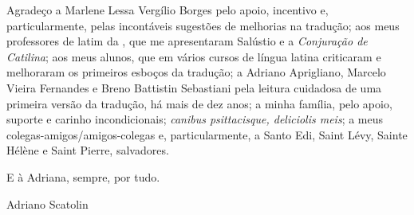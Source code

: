  
Agradeço a Marlene Lessa Vergílio Borges pelo apoio, incentivo e,
particularmente,  pelas  incontáveis sugestões de melhorias na tradução; aos
meus professores de latim da , que me apresentaram Salústio e a
\emph{Conjuração de Catilina}; aos meus alunos, que em vários
cursos de língua latina criticaram e melhoraram os primeiros esboços da tradução; a Adriano Aprigliano, Marcelo Vieira Fernandes e Breno Battistin Sebastiani pela leitura cuidadosa de uma primeira versão da tradução, há mais de dez anos; a
minha família, pelo apoio, suporte e carinho incondicionais; \emph{canibus psittacisque, deliciolis meis}; a meus colegas-amigos/amigos-colegas e, particularmente, a Santo
Edi, Saint Lévy, Sainte Hélène e Saint Pierre,  salvadores.

E à Adriana, sempre, por tudo. 

\bigskip
\hfill Adriano Scatolin 


